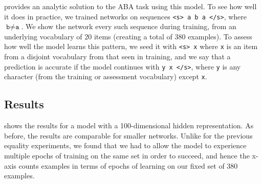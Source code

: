 \documentclass[9pt,twocolumn,twoside,lineno]{pnas-new}
\begin{document}
 provides an analytic solution to the ABA task using this model.  To see how well it does in practice, we trained networks on sequences \texttt{<s> a b a </s>}, where $\texttt{b} \neq \texttt{a}$. We show the network every such sequence during training, from an underlying vocabulary of 20 items (creating a total of 380 examples). To assess how well the model learns this pattern, we seed it with \texttt{<s> x} where \texttt{x} is an item from a disjoint vocabulary from that seen in training, and we say that a prediction is accurate if the model continues with \texttt{y x </s>}, where \texttt{y} is any character (from the training or assessment vocabulary) except \texttt{x}.


\subsection{Results}

 shows the results for a model with a 100-dimensional hidden representation. As before, the results are comparable for smaller networks. Unlike for the previous equality experiments, we found that we had to allow the model to experience multiple epochs of training on the same set in order to succeed, and hence the x-axis counts examples in terms of epochs of learning on our fixed set of 380 examples.
\end{document}
